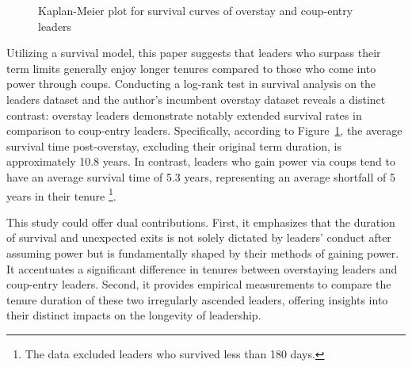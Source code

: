 \documentclass[
  12pt,
  a4paper,
  12pt]{article}
\begin{document}
\begin{figure}


\caption{\label{fig-logrank}Kaplan-Meier plot for survival curves of
overstay and coup-entry leaders}

\end{figure}%

Utilizing a survival model, this paper suggests that leaders who surpass
their term limits generally enjoy longer tenures compared to those who
come into power through coups. Conducting a log-rank test in survival
analysis on the leaders dataset \citep{goemans2009} and the author's
incumbent overstay dataset reveals a distinct contrast: overstay leaders
demonstrate notably extended survival rates in comparison to coup-entry
leaders. Specifically, according to Figure~\ref{fig-logrank}, the
average survival time post-overstay, excluding their original term
duration, is approximately 10.8 years. In contrast, leaders who gain
power via coups tend to have an average survival time of 5.3 years,
representing an average shortfall of 5 years in their tenure
\footnote{The data excluded leaders who survived less than 180 days.}.

This study could offer dual contributions. First, it emphasizes that the
duration of survival and unexpected exits is not solely dictated by
leaders' conduct after assuming power but is fundamentally shaped by
their methods of gaining power. It accentuates a significant difference
in tenures between overstaying leaders and coup-entry leaders. Second,
it provides empirical measurements to compare the tenure duration of
these two irregularly ascended leaders, offering insights into their
distinct impacts on the longevity of leadership.
\end{document}
